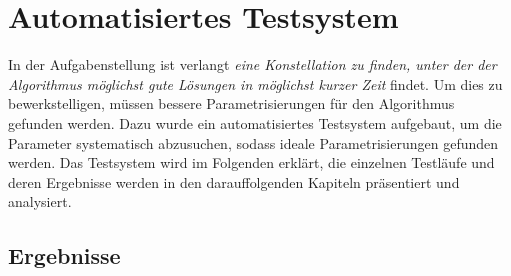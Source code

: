 \section{Automatisiertes Testsystem}\label{testsystem}

In der Aufgabenstellung \cite{aufg} ist verlangt \emph{eine Konstellation zu finden,
unter der der Algorithmus möglichst gute Lösungen in möglichst kurzer Zeit} findet.
Um dies zu bewerkstelligen, müssen bessere Parametrisierungen für den Algorithmus
gefunden werden. Dazu wurde ein automatisiertes Testsystem aufgebaut, um
die Parameter systematisch abzusuchen, sodass ideale Parametrisierungen
gefunden werden. Das Testsystem wird im Folgenden erklärt, die einzelnen Testläufe
und deren Ergebnisse werden in den darauffolgenden Kapiteln präsentiert und
analysiert.

\subsection{Ergebnisse}\label{ergebnisse} %



